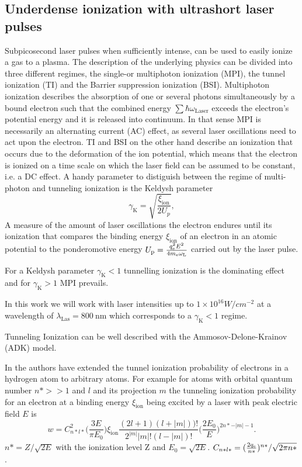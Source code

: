 \subsection{Underdense ionization with ultrashort laser pulses}
\label{sec:Theory_ionization}
Subpicosecond laser pulses when sufficiently intense, can be used to easily ionize a gas to a plasma. The description of the underlying physics can be divided into three different regimes, the single-or multiphoton ionization (MPI), the tunnel ionization (TI) and the Barrier suppression ionization (BSI).
Multiphoton ionization describes the absorption of one or several photons simultaneously by a bound electron such that the combined energy $\sum \hbar \omega_\mathrm{Laser}$ exceeds the electron's potential energy and it is released into continuum. In that sense MPI is necessarily an alternating current (AC) effect, as several laser oscillations need to act upon the electron. TI and BSI on the other hand describe an ionization that occurs due to the deformation of the ion potential, which means that the electron is ionized on a time scale on which the laser field can be assumed to be constant, i.e. a DC effect.
A handy parameter to distiguish between the regime of multi-photon and tunneling ionization is the Keldysh parameter 
\begin{equation}
\gamma_\mathrm{K}=\sqrt{\frac{\xi_\mathrm{ion}}{2U_p}},
\end{equation}
 A measure of the amount of laser oscillations the electron endures until its ionization
that compares the binding energy $\xi_\mathrm{ion}$ of an electron in an atomic potential to the ponderomotive energy $U_\mathrm{p}=\frac{q_\mathrm{e}^2 E^2}{4m_\mathrm{e} \omega_\mathrm{L}}$ carried out by the laser pulse. 

For a Keldysh parameter $\gamma_\mathrm{K}<1$ tunnelling ionization is the dominating effect and for $\gamma_\mathrm{K}>1$ MPI prevails.

In this work we will work with laser intensities up to $1\times 10^{16} W/cm^{-2}$ at a wavelength of $\lambda_\mathrm{Las}= 800\ \mathrm{nm}$ which corresponds to a $\gamma_\mathrm{K}<1$ regime.
 
 
Tunneling Ionization can be well described with the Ammosov-Delone-Krainov (ADK) model.


In \cite{ADK_original} the authors have extended the tunnel ionization probability of electrons in a hydrogen atom to arbitrary atoms. For example for atoms with orbital quantum number $n*>>1$ and $l$ and its projection $m$ the tunneling ionization probability for an electron at a binding energy $\xi_\mathrm{ion}$ being excited by a laser with peak electric field $E$ is
\begin{equation}
w=C^2_{n*l*}\Big( \frac{3E}{\pi E_0}  \Big) \xi_\mathrm{ion}\frac{(2l+1)(l+|m|))! }{2^{|m|}|m|!(l-|m|)!}\Big(\frac{2 E_0}{E} \Big)^{2n*-|m|-1}.
\end{equation}
$n*=Z/\sqrt{2E}$ with the ionization level Z and $E_0=\sqrt{2E}$. $C_{n*l*}=(\frac{2q_\mathrm{e}}{n*})^{n*}/\sqrt{2\pi n*}$.

